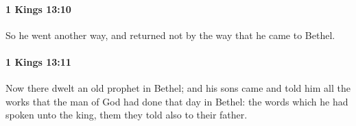 		\paragraph{1 Kings 13:10} %
			\label{1KINGS-13-10}

			So he went another way, and returned not by the way that he came to Bethel.


		\paragraph{1 Kings 13:11} %
			\label{1KINGS-13-11}

			Now there dwelt an old prophet in Bethel; and his sons came and told him all the works that the man of God had done that day in Bethel: the words which he had spoken unto the king, them they told also to their father.



